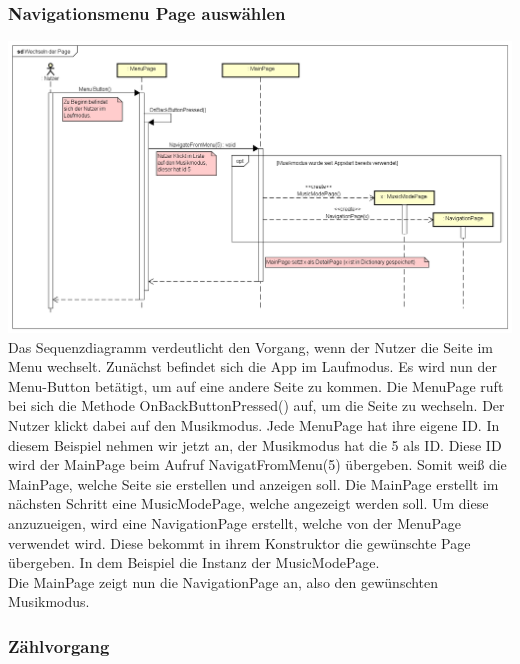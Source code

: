 \documentclass[a4paper,12pt]{article}
\begin{document}
\newpage
\subsubsection{Navigationsmenu Page auswählen}

\includegraphics[width=1.1\textwidth]{./Diagramme/NavigationsMenuSeqDia.png}\\
Das Sequenzdiagramm verdeutlicht den Vorgang, wenn der Nutzer die Seite im Menu wechselt.
Zunächst befindet sich die App im Laufmodus. Es wird nun der Menu-Button betätigt, um auf eine andere Seite zu kommen. Die MenuPage ruft bei sich die Methode OnBackButtonPressed() auf, um die Seite zu wechseln. 
Der Nutzer klickt dabei auf den Musikmodus. Jede MenuPage hat ihre eigene ID. In diesem Beispiel nehmen wir jetzt an, der Musikmodus hat die 5 als ID. Diese ID wird der MainPage beim Aufruf NavigatFromMenu(5) übergeben. Somit weiß die MainPage, welche Seite sie erstellen und anzeigen soll.
Die MainPage erstellt im nächsten Schritt eine MusicModePage, welche angezeigt werden soll. Um diese anzuzueigen, wird eine NavigationPage erstellt, welche von der MenuPage verwendet wird. Diese bekommt in ihrem Konstruktor die gewünschte Page übergeben. In dem Beispiel die Instanz der MusicModePage. \\
Die MainPage zeigt nun die NavigationPage an, also den gewünschten Musikmodus.


\subsubsection{Zählvorgang}
\end{document}
